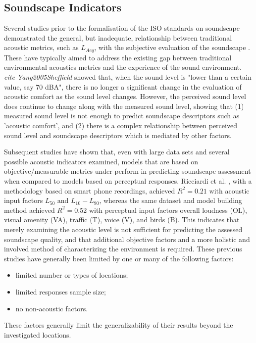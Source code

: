   \subsection{Soundscape Indicators}
    Several studies prior to the formalisation of the ISO standards on soundscape demonstrated the general, but inadequate, relationship between traditional acoustic metrics, such as $L_{Aeq}$, with the subjective evaluation of the soundscape \cite{Berglund2006a, Yang2005b,  Aumond2017, Alsina-Pages2020}.
    These have typically aimed to address the existing gap between traditional environmental acoustics metrics and the experience of the sound environment. \emph{cite Yang2005Sheffield} showed that, when the sound level is "lower than a certain value, say 70 dBA", there is no longer a significant change in the evaluation of acoustic comfort as the sound level changes. However, the perceived sound level does continue to change along with the measured sound level, showing that (1) measured sound level is not enough to predict soundscape descriptors such as 'acoustic comfort', and (2) there is a complex relationship between perceived sound level and soundscape descriptors which is mediated by other factors.

    Subsequent studies have shown that, even with large data sets and several possible acoustic indicators examined, models that are based on objective/measurable metrics under-perform in predicting soundscape assessment when compared to models based on perceptual responses. Ricciardi et al. \cite{Ricciardi2015}, with a methodology based on smart phone recordings, achieved $R^2 = 0.21$ with acoustic input factors $L_50$ and $L_10-L_90$, whereas the same dataset and model building method achieved $R^2 = 0.52$ with perceptual input factors overall loudness (OL), visual amenity (VA), traffic (T), voice (V), and birds (B). This indicates that merely examining the acoustic level is not sufficient for predicting the assessed soundscape quality, and that additional objective factors and a more holistic and involved method of characterizing the environment is required. These previous studies have generally been limited by one or many of the following factors:
    \begin{itemize}
        \item limited number or types of locations;
        \item limited responses sample size;
        \item no non-acoustic factors.
    \end{itemize}
    These factors generally limit the generalizability of their results beyond the investigated locations.

